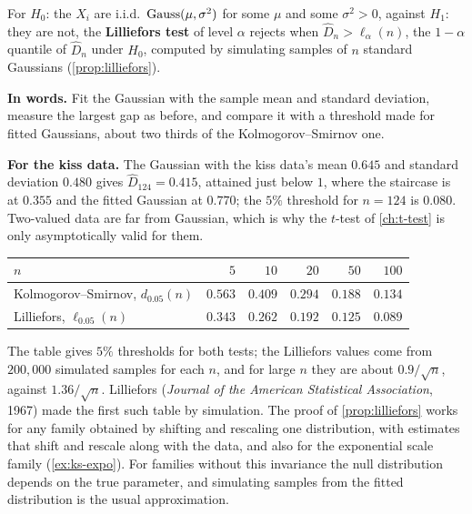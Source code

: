 \begin{definition}
\label{def:lilliefors}
For $H_0$: the $X_i$ are i.i.d.\ $\text{Gauss}(\mu, \sigma^2)$ for some $\mu$ and some $\sigma^2 > 0$, against $H_1$: they are not, the \textbf{Lilliefors test} of level $\alpha$ rejects when $\hat{D}_n > \ell_\alpha(n)$, the $1 - \alpha$ quantile of $\hat{D}_n$ under $H_0$, computed by simulating samples of $n$ standard Gaussians (\cref{prop:lilliefors}).
\end{definition}

\begin{inwords}
\textbf{In words.} Fit the Gaussian with the sample mean and standard deviation, measure the largest gap as before, and compare it with a threshold made for fitted Gaussians, about two thirds of the Kolmogorov--Smirnov one.
\par\smallskip
\textbf{For the kiss data.} The Gaussian with the kiss data's mean $0.645$ and standard deviation $0.480$ gives $\hat{D}_{124} = 0.415$, attained just below $1$, where the staircase is at $0.355$ and the fitted Gaussian at $0.770$; the $5\%$ threshold for $n = 124$ is $0.080$. Two-valued data are far from Gaussian, which is why the $t$-test of \cref{ch:t-test} is only asymptotically valid for them.
\end{inwords}

\begin{center}
\small
\begin{tabular}{@{}lrrrrr@{}}
\toprule
$n$ & $5$ & $10$ & $20$ & $50$ & $100$ \\
\midrule
Kolmogorov--Smirnov, $d_{0.05}(n)$ & $0.563$ & $0.409$ & $0.294$ & $0.188$ & $0.134$ \\
Lilliefors, $\ell_{0.05}(n)$ & $0.343$ & $0.262$ & $0.192$ & $0.125$ & $0.089$ \\
\bottomrule
\end{tabular}
\end{center}

The table gives $5\%$ thresholds for both tests; the Lilliefors values come from $200{,}000$ simulated samples for each $n$, and for large $n$ they are about $0.9/\sqrt{n}$, against $1.36/\sqrt{n}$.
Lilliefors (\textit{Journal of the American Statistical Association}, 1967) made the first such table by simulation.
The proof of \cref{prop:lilliefors} works for any family obtained by shifting and rescaling one distribution, with estimates that shift and rescale along with the data, and also for the exponential scale family (\cref{ex:ks-expo}).
For families without this invariance the null distribution depends on the true parameter, and simulating samples from the fitted distribution is the usual approximation.

